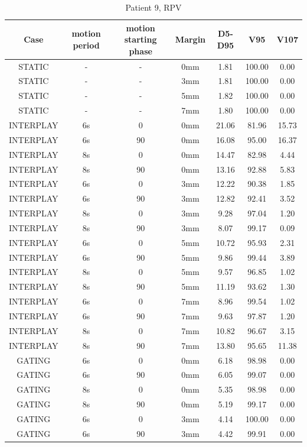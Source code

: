 \documentclass[type=dr, dr=rernat, accentcolor=tud7b,colorbacktitle, bigchapter, openright, twoside, 12pt ]{tudthesis}
\begin{document}
\begin{table}[H]
  \centering
  \caption{Patient 9, RPV}
  \begin{tabular}{|c||c|c|c||c|c|c|}
    \hline\hline
    Case & motion period & motion starting phase & Margin & D5-D95 & V95 & V107\\
    \hline 
STATIC & - & - & 0mm & 1.81 & 100.00 & 0.00 \\
STATIC & - & - & 3mm & 1.81 & 100.00 & 0.00 \\
STATIC & - & - & 5mm & 1.82 & 100.00 & 0.00 \\
STATIC & - & - & 7mm & 1.80 & 100.00 & 0.00 \\
INTERPLAY & 6s & 0 & 0mm & 21.06 & 81.96 & 15.73 \\
INTERPLAY & 6s & 90 & 0mm & 16.08 & 95.00 & 16.37 \\
INTERPLAY & 8s & 0 & 0mm & 14.47 & 82.98 & 4.44 \\
INTERPLAY & 8s & 90 & 0mm & 13.16 & 92.88 & 5.83 \\
INTERPLAY & 6s & 0 & 3mm & 12.22 & 90.38 & 1.85 \\
INTERPLAY & 6s & 90 & 3mm & 12.82 & 92.41 & 3.52 \\
INTERPLAY & 8s & 0 & 3mm & 9.28 & 97.04 & 1.20 \\
INTERPLAY & 8s & 90 & 3mm & 8.07 & 99.17 & 0.09 \\
INTERPLAY & 6s & 0 & 5mm & 10.72 & 95.93 & 2.31 \\
INTERPLAY & 6s & 90 & 5mm & 9.86 & 99.44 & 3.89 \\
INTERPLAY & 8s & 0 & 5mm & 9.57 & 96.85 & 1.02 \\
INTERPLAY & 8s & 90 & 5mm & 11.19 & 93.62 & 1.30 \\
INTERPLAY & 6s & 0 & 7mm & 8.96 & 99.54 & 1.02 \\
INTERPLAY & 6s & 90 & 7mm & 9.63 & 97.87 & 1.20 \\
INTERPLAY & 8s & 0 & 7mm & 10.82 & 96.67 & 3.15 \\
INTERPLAY & 8s & 90 & 7mm & 13.80 & 95.65 & 11.38 \\
GATING & 6s & 0 & 0mm & 6.18 & 98.98 & 0.00 \\
GATING & 6s & 90 & 0mm & 6.05 & 99.07 & 0.00 \\
GATING & 8s & 0 & 0mm & 5.35 & 98.98 & 0.00 \\
GATING & 8s & 90 & 0mm & 5.19 & 99.17 & 0.00 \\
GATING & 6s & 0 & 3mm & 4.14 & 100.00 & 0.00 \\
GATING & 6s & 90 & 3mm & 4.42 & 99.91 & 0.00 \\

\end{tabular}
\end{table}
\end{document}
